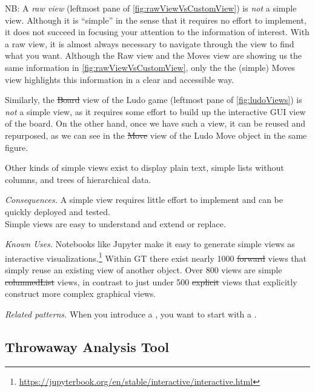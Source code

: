 \documentclass[acmsmall,screen,authorversion,nonacm]{acmart} %
\newcommand\eog[1]{\nbc{Edward}{#1}{purple}}
\newcommand\cp[1]{\nbe{Cesare}{#1}{olive}} %
\newcommand{\pattern}[2]{\needlines{10}
\subsection*{#1}\label{pat:#2}}
\newcommand{\patref}[1]{\emph{\nameref{pat:#1}}\xspace}
\newcommand{\patsec}[1]{\noindent\textit{#1.}\xspace}
\begin{document}

NB: A \emph{raw view} (leftmost pane of \autoref{fig:rawViewVsCustomView}) is \emph{not} a simple view.
Although it is ``simple'' in the sense that it requires no effort to implement, it does not succeed in focusing your attention to the information of interest.
With a raw view, it is almost always necessary to navigate through the view to find what you want.
Although the Raw view and the Moves view are showing us the same information in \autoref{fig:rawViewVsCustomView}, only the the (simple) Moves view highlights this information in a clear and accessible way.

Similarly, the \st{Board} view of the Ludo game (leftmost pane of \autoref{fig:ludoViews}) is \emph{not} a simple view, as it requires some effort to build up the interactive GUI view of the board.
On the other hand, once we have such a view, it can be reused and repurposed, as we can see in the \st{Move} view of the Ludo Move object in the same figure.

Other kinds of simple views exist to display plain text, simple lists without columns, and trees of hierarchical data.

\patsec{Consequences}
A simple view requires little effort to implement and can be quickly deployed and tested.\\
Simple views are easy to understand and extend or replace.

\patsec{Known Uses}
Notebooks like Jupyter make it easy to generate simple views as interactive visualizations.\footnote{\href{https://web.archive.org/web/20240430071604/https://jupyterbook.org/en/stable/interactive/interactive.html}{https://jupyterbook.org/en/stable/interactive/interactive.html}}
Within GT there exist nearly 1000 \st{forward} views that simply reuse an existing view of another object.
Over 800 views are simple \st{columnedList} views, in contrast to just under 500 \st{explicit} views that explicitly construct more complex graphical views.

\patsec{Related patterns}
When you introduce a \patref{CustomView}, you want to start with a \patref{SimpleView}.

\pattern{Throwaway Analysis Tool}{ThrowawayAnalysisTool}
\end{document}
